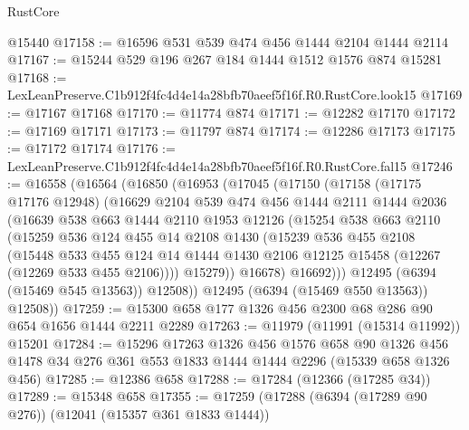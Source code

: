 \begin{lexlean}{RustCore}
\begin{coremodule}
    @15440
@17158 := @16596 @531 @539 @474 @456 @1444 @2104 @1444 @2114
@17167 := @15244 @529 @196 @267 @184 @1444 @1512 @1576 @874 @15281
@17168 := LexLeanPreserve.C1b912f4fc4d4e14a28bfb70aeef5f16f.R0.RustCore.look15
@17169 := @17167 @17168
@17170 := @11774 @874
@17171 := @12282 @17170
@17172 := @17169 @17171
@17173 := @11797 @874
@17174 := @12286 @17173
@17175 := @17172 @17174
@17176 := LexLeanPreserve.C1b912f4fc4d4e14a28bfb70aeef5f16f.R0.RustCore.fal15
@17246 := @16558
    (@16564
      (@16850
        (@16953
          (@17045
            (@17150
              (@17158
                (@17175 @17176 @12948)
                (@16629
                  @2104
                  @539
                  @474
                  @456
                  @1444
                  @2111
                  @1444
                  @2036
                  (@16639
                    @538
                    @663
                    @1444
                    @2110
                    @1953
                    @12126
                    (@15254
                      @538
                      @663
                      @2110
                      (@15259
                        @536
                        @124
                        @455
                        @14
                        @2108
                        @1430
                        (@15239
                          @536
                          @455
                          @2108
                          (@15448
                            @533
                            @455
                            @124
                            @14
                            @1444
                            @1430
                            @2106
                            @12125
                            @15458
                            (@12267 (@12269 @533 @455 @2106))))
                        @15279))
                    @16678)
                  @16692)))
            @12495
            (@6394 (@15469 @545 @13563))
            @12508))
        @12495
        (@6394 (@15469 @550 @13563))
        @12508))
@17259 := @15300 @658 @177 @1326 @456 @2300 @68 @286 @90 @654 @1656 @1444 @2211 @2289
@17263 := @11979 (@11991 (@15314 @11992)) @15201
@17284 := @15296
    @17263
    @1326
    @456
    @1576
    @658
    @90
    @1326
    @456
    @1478
    @34
    @276
    @361
    @553
    @1833
    @1444
    @1444
    @2296
    (@15339 @658 @1326 @456)
@17285 := @12386 @658
@17288 := @17284 (@12366 (@17285 @34))
@17289 := @15348 @658
@17355 := @17259
    (@17288
      (@6394 (@17289 @90 @276))
      (@12041 (@15357 @361 @1833 @1444))

\end{coremodule}
\end{lexlean}
